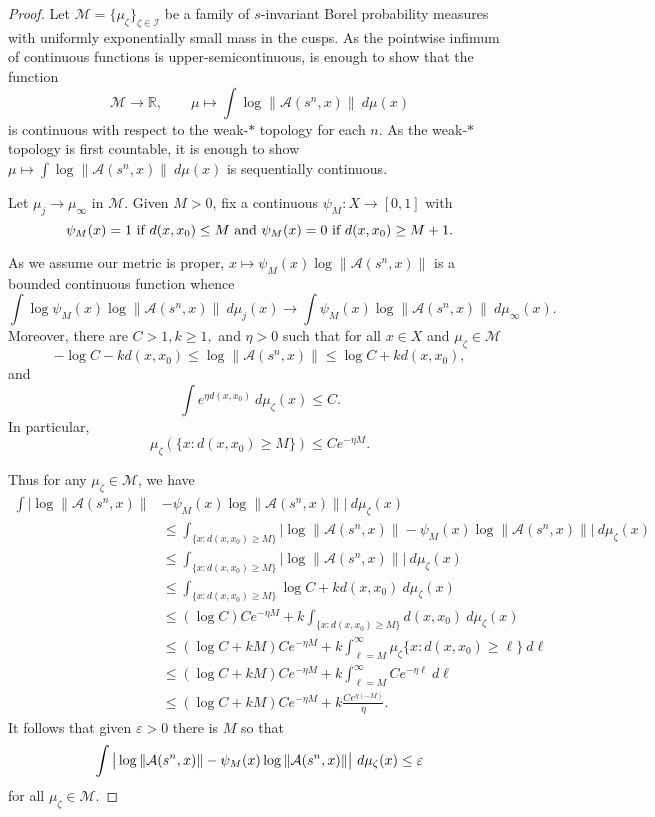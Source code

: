 \documentclass[10pt,reqno]{amsart}
\theoremstyle{Theorem}
\theoremstyle{definition}
\theoremstyle{remark}
\renewcommand{\epsilon}{\varepsilon}
\newcommand{\R}{\mathbb {R}}
\def\calI{\mathcal I}
\def\calA{\mathcal A}
\def\calM{\mathcal M}
\def\calI{\mathcal I}
\begin{document}
\begin{proof}

Let $\calM = \{\mu_\zeta\}_{\zeta\in \calI}$ be a family of $s$-invariant Borel probability measures with  uniformly exponentially small mass in the cusps.  As the pointwise infimum of continuous functions is upper-semicontinuous, is enough to show that the function $$\calM\to \R,\quad \quad \mu\mapsto \int \log \|\calA(s^n, x)\| \ d \mu (x)$$
is  continuous with respect to the weak-$*$ topology for each $n$.  As the weak-$*$ topology is first countable, it is enough to show $\mu\mapsto \int \log \|\calA(s^n, x)\| \ d \mu (x)$ is sequentially continuous.


Let $\mu_j \to \mu_\infty$ in $\calM$.  Given $M>0$, fix a continuous
$\psi_M\colon X\to [0,1]$ with $$ \text{$ \psi_M(x) = 1$ if $d(x,x_0) \le M$ and $\psi_M(x) = 0$ if $d(x,x_0)\ge M+ 1$}.$$


As we assume our metric   is proper,  $x\mapsto \psi_M (x)\log \|\calA(s^n, x)\|$ is a bounded continuous function whence  $$\int \log\psi_M(x)  \log \|\calA(s^n, x)\|\  d \mu_j (x) \to \int\psi_M(x) \log \|\calA(s^n, x)\|  \ d \mu_\infty  (x).$$
Moreover, there are $C>1, k\ge 1,$ and $\eta>0$ such that for all $x\in X$ and $\mu_\zeta\in \calM$
$$- \log C- {k d(x,x_0)} \le \log \|\calA(s^n, x)\| \le \log C+ {k d(x,x_0)}, $$ and $$ \int e^{\eta d(x, x_0)} \ d \mu_\zeta(x)\le C.$$
In particular, $$\mu_\zeta(\{x: d(x,x_0) \ge   M\})\le C e^{-\eta   M}.$$

Thus for any $\mu_\zeta\in \calM$,  we have
\begin{align*}
\int  \big | \log \|\calA(s^n, x)\| &- \psi_M(x)\log \|\calA(s^n, x)\|   \big|  \ d \mu_\zeta(x) \\
& \le  \int_{\{x: d(x,x_0) \ge   M \}}\big | \log \|\calA(s^n, x)\|  - \psi_M(x)\log \|\calA(s^n, x)\|   \big|   \ d \mu_\zeta(x) \\
& \le  \int_{\{x: d(x,x_0) \ge   M \}}\big | \log \|\calA(s^n, x)\|   \big|   \ d \mu_\zeta(x) \\
    &\le  \int_{\{x: d(x,x_0) \ge   M\}}  \log C+ {k d(x,x_0)}    \ d \mu_\zeta(x)  \\
    &\le (\log C  ) C e^{-\eta  M}   + k \int_{\{x: d(x,x_0) \ge   M\}}   { d(x,x_0)}   \ d \mu_\zeta(x)  \\
        &\le (\log C   + k M) C e^{-\eta M}  + k\int_{\ell =  M} ^\infty \mu_\zeta\{ x:    { d(x,x_0)} \ge \ell\} \ d \ell\\
                &\le (\log C +k  M) C e^{-\eta M}  + k\int_{\ell =  M} ^\infty  Ce^{-\eta \ell}  \ d \ell\\
                                &\le (\log C + k M) C e^{-\eta M}  + k\frac{C e^{\eta  (- M)}}{\eta }.
\end{align*}
It follows that given $\epsilon>0$ there is $M$ so that
$$\int  \big | \log \|\calA(s^n, x)\| - \psi_M(x)\log \|\calA(s^n, x)\|   \big|  \ d \mu_\zeta(x) \\  \le \epsilon$$
for all $\mu_\zeta\in \calM$.


\end{proof}
\end{document}
